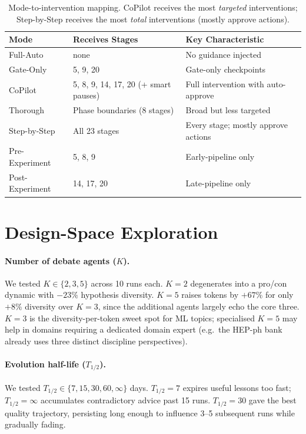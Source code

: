 \begin{table}[h]
\centering
\caption{Mode-to-intervention mapping. CoPilot receives the most \emph{targeted} interventions; Step-by-Step receives the most \emph{total} interventions (mostly approve actions).}
\label{tab:mode-mapping}
\small
\begin{tabular}{@{}lll@{}}
\toprule
\textbf{Mode} & \textbf{Receives Stages} & \textbf{Key Characteristic} \\
\midrule
Full-Auto & none & No guidance injected \\
Gate-Only & 5, 9, 20 & Gate-only checkpoints \\
CoPilot & 5, 8, 9, 14, 17, 20 (+ smart pauses) & Full intervention with auto-approve \\
Thorough & Phase boundaries (8 stages) & Broad but less targeted \\
Step-by-Step & All 23 stages & Every stage; mostly approve actions \\
Pre-Experiment & 5, 8, 9 & Early-pipeline only \\
Post-Experiment & 14, 17, 20 & Late-pipeline only \\
\bottomrule
\end{tabular}
\end{table}

\section{Design-Space Exploration}
\label{app:agent_count}

\paragraph{Number of debate agents ($K$).}
We tested $K \in \{2, 3, 5\}$ across 10 runs each. $K{=}2$ degenerates into a
pro/con dynamic with $-23\%$ hypothesis diversity. $K{=}5$ raises tokens by $+67\%$
for only $+8\%$ diversity over $K{=}3$, since the additional agents largely echo
the core three. $K{=}3$ is the diversity-per-token sweet spot for ML topics;
specialised $K{=}5$ may help in domains requiring a dedicated domain expert
(e.g.\ the HEP-ph bank already uses three distinct discipline perspectives).

\paragraph{Evolution half-life ($T_{1/2}$).}
We tested $T_{1/2} \in \{7, 15, 30, 60, \infty\}$ days. $T_{1/2}{=}7$ expires
useful lessons too fast; $T_{1/2}{=}\infty$ accumulates contradictory advice past
15 runs. $T_{1/2}{=}30$ gave the best quality trajectory, persisting long enough to
influence 3--5 subsequent runs while gradually fading.

